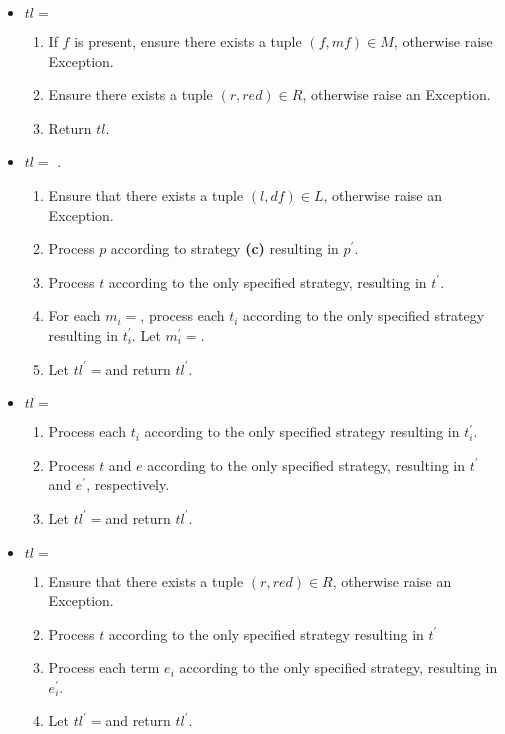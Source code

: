 \begin{itemize}
\begin{enumerate}
\end{enumerate}

\item $tl=$ \ReadFromStdinAndApplyReductionRelation
\begin{enumerate}
\item If $f$ is present, ensure there exists a tuple $(f, mf) \in M$, otherwise raise Exception.
\item Ensure there exists a tuple $(r, red) \in R$, otherwise raise an Exception.
\item Return $tl$.
\end{enumerate}

\item
$tl=$ \RedexMatchAssertEqual.
	\begin{enumerate}
	\item Ensure that there exists a tuple $(l, df) \in L$, otherwise raise an Exception.
	\item Process $p$ according to strategy \textbf{(c)} resulting in $p^\prime$.
	\item Process $t$ according to the only specified strategy, resulting in $t^\prime$.
	\item For each $m_i=$\space \Match, process each $t_i$ according to the only specified strategy resulting in $t_i^\prime$. Let $m_i^\prime=$\space \Match[$s_1$][$t_1^\prime$][$s_n$][$t_n^\prime$][false].
	\item Let $tl^\prime=$\space\RedexMatchAssertEqual[$l$][$p^\prime$][$t^\prime$][$m_1^\prime$][$m_n^\prime$][false] and return $tl^\prime$.
	\end{enumerate}

\item $tl=$ \TermLetAssertEqual
	\begin{enumerate}
	\item  Process each $t_i$ according to the only specified strategy resulting in $t_i^\prime$.
	\item Process $t$ and $e$ according to the only specified strategy, resulting in $t^\prime$ and $e^\prime$, respectively.
	\item Let $tl^\prime=$\space \TermLetAssertEqual[$v_1$][$n_1$][$t_1^\prime$][$v_m$][$n_m$][$t_m^\prime$][$t^\prime$][$e^\prime$][false] and return $tl^\prime$.
	\end{enumerate}

\item $tl=$ \ApplyReductionRelationAssertEqual
	\begin{enumerate}
	\item Ensure that there exists a tuple $(r, red) \in R$, otherwise raise an Exception.
	\item Process $t$ according to the only specified strategy resulting in $t^\prime$
	\item Process each term $e_i$ according to the only specified strategy, resulting in $e_i^\prime$.
	\item Let $tl^\prime=$\space \ApplyReductionRelationAssertEqual[$r$][$t^\prime$][$e_1^\prime$][$e_n^\prime$][false] and return $tl^\prime$.
	\end{enumerate}
\end{itemize}

